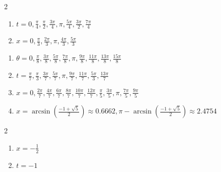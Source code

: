 \documentclass{ximera}
\begin{document}
\begin{multicols}{2}

\begin{enumerate}

\setcounter{enumi}{\value{HW}}

\item  $t = 0, \frac{\pi}{4}, \frac{\pi}{2}, \frac{3\pi}{4}, \pi, \frac{5\pi}{4}, \frac{3\pi}{2}, \frac{7\pi}{4}$
\item $x = 0, \frac{\pi}{3}, \frac{2\pi}{3}, \pi, \frac{4\pi}{3}, \frac{5\pi}{3}$

\setcounter{HW}{\value{enumi}}

\end{enumerate}

\end{multicols}

\begin{enumerate}

\setcounter{enumi}{\value{HW}}

\item $\theta = 0, \frac{\pi}{8}, \frac{3\pi}{8}, \frac{5\pi}{8}, \frac{7\pi}{8}, \pi, \frac{9\pi}{8}, \frac{11\pi}{8}, \frac{13\pi}{8}, \frac{15\pi}{8}$

\item $t = \frac{\pi}{7}, \frac{\pi}{3}, \frac{3\pi}{7}, \frac{5\pi}{7}, \pi, \frac{9\pi}{7}, \frac{11\pi}{7}, \frac{5\pi}{3}, \frac{13\pi}{7}$ 

\item $x = 0, \frac{2\pi}{7}, \frac{4\pi}{7}, \frac{6\pi}{7}, \frac{8\pi}{7}, \frac{10\pi}{7}, \frac{12\pi}{7}, \frac{\pi}{5}, \frac{3\pi}{5}, \pi, \frac{7\pi}{5}, \frac{9\pi}{5}$ 

\item $x = \arcsin \left( \frac{-1 + \sqrt{5}}{2} \right) \approx 0.6662, \pi - \arcsin \left( \frac{-1 + \sqrt{5}}{2} \right) \approx 2.4754$

\setcounter{HW}{\value{enumi}}

\end{enumerate}

\begin{multicols}{2}
\begin{enumerate}
\setcounter{enumi}{\value{HW}}

\item $x = -\frac{1}{2}$
\item $t=-1$ 

\setcounter{HW}{\value{enumi}}
\end{enumerate}
\end{multicols}
\end{document}
